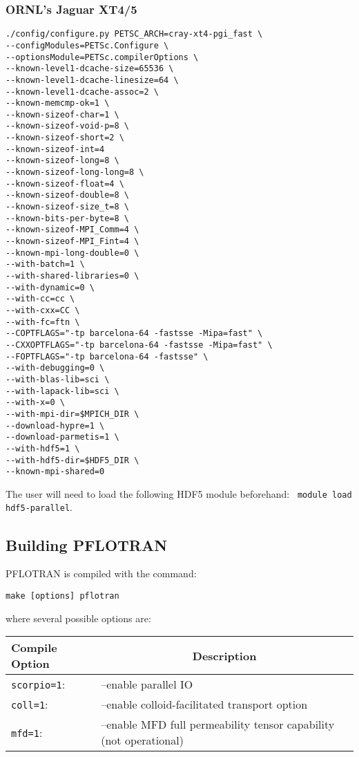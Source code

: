 \subsubsection{ORNL's Jaguar XT4/5}

\footnotesize
\begin{verbatim}
./config/configure.py PETSC_ARCH=cray-xt4-pgi_fast \
--configModules=PETSc.Configure \
--optionsModule=PETSc.compilerOptions \
--known-level1-dcache-size=65536 \
--known-level1-dcache-linesize=64 \
--known-level1-dcache-assoc=2 \
--known-memcmp-ok=1 \
--known-sizeof-char=1 \
--known-sizeof-void-p=8 \
--known-sizeof-short=2 \
--known-sizeof-int=4
--known-sizeof-long=8 \
--known-sizeof-long-long=8 \
--known-sizeof-float=4 \
--known-sizeof-double=8 \
--known-sizeof-size_t=8 \
--known-bits-per-byte=8 \
--known-sizeof-MPI_Comm=4 \
--known-sizeof-MPI_Fint=4 \
--known-mpi-long-double=0 \
--with-batch=1 \
--with-shared-libraries=0 \
--with-dynamic=0 \
--with-cc=cc \
--with-cxx=CC \
--with-fc=ftn \
--COPTFLAGS="-tp barcelona-64 -fastsse -Mipa=fast" \
--CXXOPTFLAGS="-tp barcelona-64 -fastsse -Mipa=fast" \
--FOPTFLAGS="-tp barcelona-64 -fastsse" \
--with-debugging=0 \
--with-blas-lib=sci \
--with-lapack-lib=sci \
--with-x=0 \
--with-mpi-dir=$MPICH_DIR \
--download-hypre=1 \
--download-parmetis=1 \
--with-hdf5=1 \
--with-hdf5-dir=$HDF5_DIR \
--known-mpi-shared=0
\end{verbatim}
\normalsize
The user will need to load the following HDF5 module beforehand: \ \verb|module load hdf5-parallel|.

\subsection{Building PFLOTRAN}
 
PFLOTRAN is compiled with the command:

\verb|make [options] pflotran|

\noindent
where several possible options are: 

\begin{tabular}{ll}
Compile Option & \multicolumn{1}{c}{Description}\\
\midrule
\verb|scorpio=1|: & --enable parallel IO\\
\verb|coll=1|: & --enable colloid-facilitated transport option\\
\verb|mfd=1|: & --enable MFD full permeability tensor capability (not operational)
\end{tabular}

